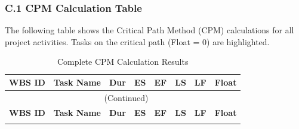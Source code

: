 
\subsubsection*{C.1 CPM Calculation Table}\label{app:cpm_table}

The following table shows the Critical Path Method (CPM) calculations for all project activities. Tasks on the critical path (Float = 0) are highlighted.

\begin{longtable}{@{}llrrrrrl@{}}
\caption{Complete CPM Calculation Results} \\
\toprule
\textbf{WBS ID} & \textbf{Task Name} & \textbf{Dur} & \textbf{ES} & \textbf{EF} & \textbf{LS} & \textbf{LF} & \textbf{Float} \\
\midrule
\endfirsthead
\multicolumn{8}{c}{\tablename\ \thetable{} (Continued)} \\
\toprule
\textbf{WBS ID} & \textbf{Task Name} & \textbf{Dur} & \textbf{ES} & \textbf{EF} & \textbf{LS} & \textbf{LF} & \textbf{Float} \\
\midrule
\endhead
\bottomrule
\endlastfoot


\end{longtable}
